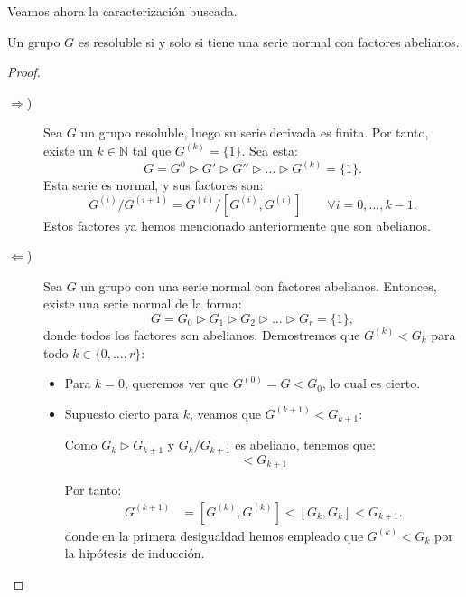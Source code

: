 \begin{ejercicio}
    Veamos ahora la caracterización buscada.
    \begin{prop}
        Un grupo \(G\) es resoluble si y solo si tiene una serie normal con factores abelianos.
        \begin{proof}~
            \begin{description}
                \item[$\Longrightarrow$)] Sea \(G\) un grupo resoluble, luego su serie derivada es finita. Por tanto, existe un \(k\in \mathbb{N}\) tal que \(G^{(k)} = \{1\}\). Sea esta:
                \begin{equation*}
                    G = G^0 \rhd G' \rhd G'' \rhd \ldots \rhd G^{(k)} = \{1\}.
                \end{equation*}
                Esta serie es normal, y sus factores son:
                \begin{equation*}
                    G^{(i)} / G^{(i+1)} = G^{(i)} / [G^{(i)}, G^{(i)}]\qquad \forall i = 0, \ldots, k-1.
                \end{equation*}
                Estos factores ya hemos mencionado anteriormente que son abelianos.


                \item[$\Longleftarrow$)] Sea \(G\) un grupo con una serie normal con factores abelianos. Entonces, existe una serie normal de la forma:
                \begin{equation*}
                    G = G_0 \rhd G_1 \rhd G_2 \rhd \ldots \rhd G_r = \{1\},
                \end{equation*}
                donde todos los factores son abelianos. Demostremos que $G^{(k)}< G_k$ para todo \(k\in \{0, \ldots, r\}\):
                \begin{itemize}
                    \item Para \(k = 0\), queremos ver que $G^{(0)} = G < G_0$, lo cual es cierto.
                    \item Supuesto cierto para \(k\), veamos que $G^{(k+1)} < G_{k+1}$:
                    
                    Como $G_{k}\rhd G_{k+1}$ y $G_k/G_{k+1}$ es abeliano, tenemos que:
                    \begin{equation*}
                        [G_k, G_k] < G_{k+1}
                    \end{equation*}

                    Por tanto:
                    \begin{align*}
                        G^{(k+1)} &= [G^{(k)}, G^{(k)}] < [G_k, G_k] < G_{k+1}.
                    \end{align*}
                    donde en la primera desigualdad hemos empleado que \(G^{(k)} < G_k\) por la hipótesis de inducción.
                \end{itemize}


\end{description}
\end{proof}
\end{prop}
\end{ejercicio}
